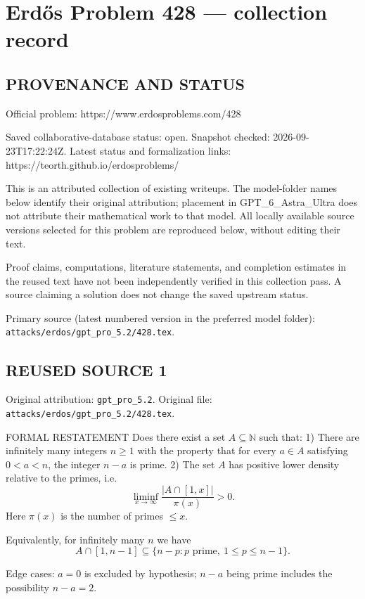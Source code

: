 \section*{Erd\H{o}s Problem 428 --- collection record}

\subsection*{PROVENANCE AND STATUS}
Official problem: https://www.erdosproblems.com/428

Saved collaborative-database status: open.
Snapshot checked: 2026-09-23T17:22:24Z.
Latest status and formalization links: https://teorth.github.io/erdosproblems/

This is an attributed collection of existing writeups. The model-folder names below identify their original attribution; placement in GPT\_6\_Astra\_Ultra does not attribute their mathematical work to that model. All locally available source versions selected for this problem are reproduced below, without editing their text.

Proof claims, computations, literature statements, and completion estimates in the reused text have not been independently verified in this collection pass. A source claiming a solution does not change the saved upstream status.

Primary source (latest numbered version in the preferred model folder): \texttt{attacks/erdos/gpt\_pro\_5.2/428.tex}.

\subsection*{REUSED SOURCE 1}
Original attribution: \texttt{gpt\_pro\_5.2}.
Original file: \texttt{attacks/erdos/gpt\_pro\_5.2/428.tex}.


FORMAL RESTATEMENT
Does there exist a set $A\subseteq\mathbb N$ such that:
1) There are infinitely many integers $n\ge 1$ with the property that for every $a\in A$ satisfying $0<a<n$, the integer $n-a$ is prime.
2) The set $A$ has positive lower density relative to the primes, i.e.
\[
\liminf_{x\to\infty}\frac{|A\cap[1,x]|}{\pi(x)}>0.
\]
Here $\pi(x)$ is the number of primes $\le x$.

Equivalently, for infinitely many $n$ we have
\[
A\cap[1,n-1]\subseteq \{n-p: p\text{ prime},\ 1\le p\le n-1\}.
\]

Edge cases: $a=0$ is excluded by hypothesis; $n-a$ being prime includes the possibility $n-a=2$.

